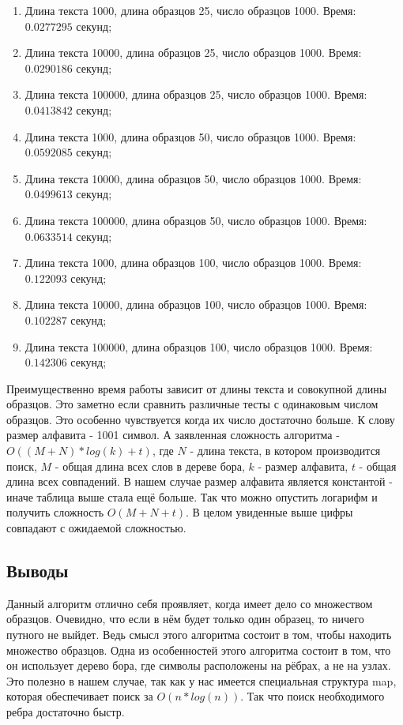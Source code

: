 \documentclass[12pt]{article}
\begin{document}
\begin{enumerate}
	\item Длина текста 1000, длина образцов 25, число образцов 1000. Время: $0.0277295$ секунд;
	\item Длина текста 10000, длина образцов 25, число образцов 1000. Время: $0.0290186$ секунд;
	\item Длина текста 100000, длина образцов 25, число образцов 1000. Время: $0.0413842$ секунд;
	\item Длина текста 1000, длина образцов 50, число образцов 1000. Время: $0.0592085$ секунд;
	\item Длина текста 10000, длина образцов 50, число образцов 1000. Время: $0.0499613$ секунд;
	\item Длина текста 100000, длина образцов 50, число образцов 1000. Время: $0.0633514$ секунд;
	\item Длина текста 1000, длина образцов 100, число образцов 1000. Время: $0.122093$ секунд;
	\item Длина текста 10000, длина образцов 100, число образцов 1000. Время: $0.102287$ секунд;
	\item Длина текста 100000, длина образцов 100, число образцов 1000. Время: $0.142306$ секунд;
\end{enumerate}

Преимущественно время работы зависит от длины текста и совокупной длины образцов. Это заметно если сравнить различные тесты с одинаковым числом образцов. Это особенно чувствуется когда их число достаточно больше. К слову размер алфавита - 1001 символ. А заявленная сложность алгоритма - $O((M + N)*log(k) + t)$, где $N$ - длина текста, в котором производится поиск, $M$ - общая длина всех слов в дереве бора, $k$ - размер алфавита, $t$ - общая длина всех совпадений. В нашем случае размер алфавита является константой - иначе таблица выше стала ещё больше. Так что можно опустить логарифм и получить сложность $O(M + N + t)$. В целом увиденные выше цифры совпадают с ожидаемой сложностью.

\subsection*{Выводы}

Данный алгоритм отлично себя проявляет, когда имеет дело со множеством образцов. Очевидно, что если в нём будет только один образец, то ничего путного не выйдет. Ведь смысл этого алгоритма состоит в том, чтобы находить множество образцов. Одна из особенностей этого алгоритма состоит в том, что он использует дерево бора, где символы расположены на рёбрах, а не на узлах. Это полезно в нашем случае, так как у нас имеется специальная структура map, которая обеспечивает поиск за $O(n*log(n))$. Так что поиск необходимого ребра достаточно быстр.
\end{document}
